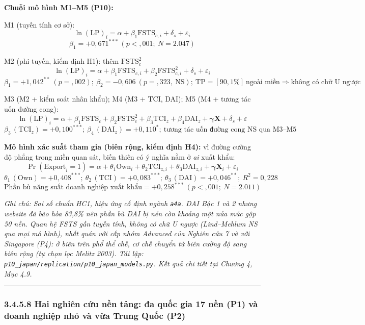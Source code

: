 \documentclass[
  a4paper,
  13pt]{extreport}
\begin{document}
\textbf{Chuỗi mô hình M1--M5 (P10):}

M1 (tuyến tính cơ sở):
\[\ln(\mathrm{LP})_{i} = \alpha + \beta_1 \mathrm{FSTS}_{c,i} + \delta_s + \varepsilon_{i}\]
\[\beta_1 = +0{,}671^{***}\ (p < {,}001;\ N = 2.047)\]

M2 (phi tuyến, kiểm định H1): thêm \(\mathrm{FSTS}_{c}^{2}\)
\[\ln(\mathrm{LP})_{i} = \alpha + \beta_1 \mathrm{FSTS}_{c,i} + \beta_2 \mathrm{FSTS}_{c,i}^{2} + \delta_s + \varepsilon_{i}\]
\[\beta_1 = +1{,}042^{**}\ (p = {,}002);\ \beta_2 = -0{,}606\ (p = {,}323,\ \text{NS});\ \mathrm{TP} = [90{,}1\%]\ \text{ngoài miền} \Rightarrow \text{không có chữ U ngược}\]

M3 (M2 + kiểm soát nhân khẩu); M4 (M3 + TCI, DAI); M5 (M4 + tương tác
uốn đường cong):
\[\ln(\mathrm{LP})_{i} = \alpha + \beta_1 \mathrm{FSTS}_{c} + \beta_2 \mathrm{FSTS}_{c}^{2} + \beta_3 \mathrm{TCI}_{z} + \beta_4 \mathrm{DAI}_{z} + \boldsymbol{\gamma}\mathbf{X} + \delta_s + \varepsilon\]
\[\beta_3\,(\mathrm{TCI}_{z}) = +0{,}100^{***};\ \beta_4\,(\mathrm{DAI}_{z}) = +0{,}110^{*};\ \text{tương tác uốn đường cong NS qua M3–M5}\]

\textbf{Mô hình xác suất tham gia (biên rộng, kiểm định H4):} vì đường
cường độ phẳng trong miền quan sát, biến thiên có ý nghĩa nằm ở
\emph{ai} xuất khẩu:
\[\Pr(\mathrm{Export}_{i} = 1) = \alpha + \theta_1 \mathrm{Own}_{i} + \theta_2 \mathrm{TCI}_{z,i} + \theta_3 \mathrm{DAI}_{z,i} + \boldsymbol{\gamma}\mathbf{X}_{i} + \varepsilon_{i}\]
\[\theta_1\,(\mathrm{Own}) = +0{,}408^{***};\ \theta_2\,(\mathrm{TCI}) = +0{,}083^{***};\ \theta_3\,(\mathrm{DAI}) = +0{,}046^{**};\ R^2 = 0{,}228\]
\[\text{Phần bù năng suất doanh nghiệp xuất khẩu} = +0{,}258^{***}\ (p < {,}001;\ N = 2.011)\]

\emph{Ghi chú: Sai số chuẩn HC1, hiệu ứng cố định ngành \texttt{a4a}.
DAI Bậc 1 và 2 nhưng website đã bão hòa 83,8\% nên phần bù DAI bị nén
còn khoảng một nửa mức gộp 50 nền. Quan hệ FSTS gần tuyến tính, không có
chữ U ngược (Lind--Mehlum NS qua mọi mô hình), nhất quán với cấp nhóm
Advanced của Nghiên cứu 7 và với Singapore (P4): ở biên trên phổ thể
chế, cơ chế chuyển từ biên cường độ sang biên rộng (tự chọn lọc Melitz
2003). Tái lập: \texttt{p10\_japan/replication/p10\_japan\_models.py}.
Kết quả chi tiết tại Chương 4, Mục 4.9.}

\begin{center}\rule{0.5\linewidth}{0.5pt}\end{center}

\hypertarget{hai-nghiuxean-cux1ee9u-nux1ec1n-tux1ea3ng-ux111a-quux1ed1c-gia-17-nux1ec1n-p1-vuxe0-doanh-nghiux1ec7p-nhux1ecf-vuxe0-vux1eeba-trung-quux1ed1c-p2}{%
\subsubsection{3.4.5.8 Hai nghiên cứu nền tảng: đa quốc gia 17 nền (P1)
và doanh nghiệp nhỏ và vừa Trung Quốc
(P2)}\label{hai-nghiuxean-cux1ee9u-nux1ec1n-tux1ea3ng-ux111a-quux1ed1c-gia-17-nux1ec1n-p1-vuxe0-doanh-nghiux1ec7p-nhux1ecf-vuxe0-vux1eeba-trung-quux1ed1c-p2}}
\end{document}
